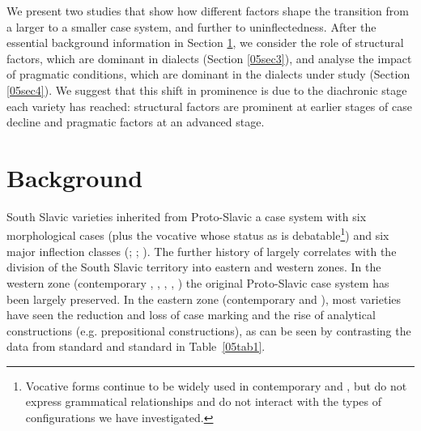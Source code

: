 \documentclass[output=paper,colorlinks,citecolor=brown]{langscibook}
\begin{document}
We present two  studies that show how different factors shape the transition from a larger to a smaller case system, and further to uninflectedness. After the essential background information in Section \ref{05sec2}, we consider the role of structural factors, which are dominant in  dialects (Section \ref{05sec3}), and analyse the impact of pragmatic conditions, which are dominant in the  dialects under study (Section \ref{05sec4}). We suggest that this shift in prominence is due to the diachronic stage each variety has reached: structural factors are prominent at earlier stages of case decline and pragmatic factors at an advanced stage.

\section{Background} \label{05sec2}

\largerpage[-1.5]

South Slavic varieties inherited from Proto-Slavic a case system with six morphological cases (plus the vocative whose status as  is debatable\footnote{Vocative forms continue to be widely used in contemporary  and , but do not express grammatical relationships \citep[8]{blake2004} and do not interact with the types of configurations we have investigated.}) and six major inflection classes (\citealt[147--160]{mircev1958}; \citealt[127--178]{slavova2017}; \citealt[115]{popovic1955}). The further history of  largely correlates with the division of the South Slavic territory into eastern and western zones. In the western zone (contemporary , , , , ) the original Proto-Slavic case system has been largely preserved. In the eastern zone (contemporary  and ), most varieties have seen the reduction and loss of  case marking and the rise of analytical constructions (e.g. prepositional constructions), as can be seen by contrasting the data from standard  and standard  in Table~\ref{05tab1}.
\end{document}
